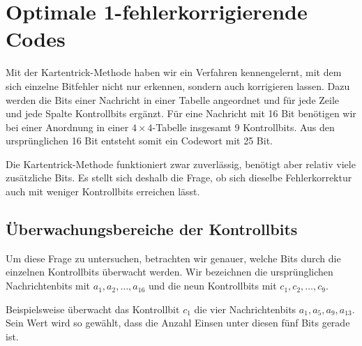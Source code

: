 \clearpage
\section{Optimale 1-fehlerkorrigierende Codes}




Mit der Kartentrick-Methode haben wir ein Verfahren kennengelernt,
mit dem sich einzelne Bitfehler nicht nur erkennen, sondern auch
korrigieren lassen. Dazu werden die Bits einer Nachricht in einer
Tabelle angeordnet und für jede Zeile und jede Spalte Kontrollbits
ergänzt. Für eine Nachricht mit 16 Bit benötigen wir bei einer
Anordnung in einer \(4\times 4\)-Tabelle insgesamt 9 Kontrollbits.
Aus den ursprünglichen 16 Bit entsteht somit ein Codewort mit
25 Bit.

Die Kartentrick-Methode funktioniert zwar zuverlässig, benötigt
aber relativ viele zusätzliche Bits. Es stellt sich deshalb die
Frage, ob sich dieselbe Fehlerkorrektur auch mit weniger
Kontrollbits erreichen lässt.


\subsection*{Überwachungsbereiche der Kontrollbits}

Um diese Frage zu untersuchen, betrachten wir genauer, welche Bits
durch die einzelnen Kontrollbits überwacht werden. Wir bezeichnen
die ursprünglichen Nachrichtenbits mit
\(a_1,a_2,\ldots,a_{16}\) und die neun Kontrollbits mit
\(c_1,c_2,\ldots,c_9\).

Beispielsweise überwacht das Kontrollbit \(c_1\) die vier
Nachrichtenbits \(a_1,a_5,a_9,a_{13}\). Sein Wert wird so gewählt,
dass die Anzahl Einsen unter diesen fünf Bits gerade ist.


